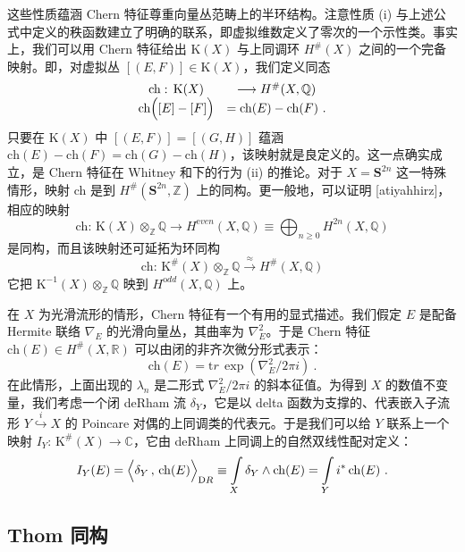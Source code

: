 \documentclass[11pt,a4paper]{ctexart}
\newcommand{\SrcRange}[2]{\marginpar{\raggedright\footnotesize 原文 p.#1}}
\begin{document}
这些性质蕴涵 Chern 特征尊重向量丛范畴上的半环结构。注意性质 (i) 与上述公式中定义的秩函数建立了明确的联系，即虚拟维数定义了零次的一个示性类。事实上，我们可以用 Chern 特征给出 \({\mathrm K}(X)\) 与上同调环 \(H^\#(X)\) 之间的一个完备映射。即，对虚拟丛 \([(E,F)]\in{\mathrm K}(X)\)，我们定义同态 \[\begin{matrix}
\mathrm{ch}:\, {\mathrm K}(X)&\longrightarrow H^\#(X,{\mathbb{Q}})\\
\mathrm{ch}\Bigl(\left[E\right]-\left[F\right]\Bigr)&= \mathrm{ch}(E)-\mathrm{ch}(F)\ .
\end{matrix}\] 只要在 \({\mathrm K}(X)\) 中 \([(E,F)]=[(G,H)]\) 蕴涵 \(\mathrm{ch}(E)-\mathrm{ch}(F)=\mathrm{ch}(G)-\mathrm{ch}(H)\)，该映射就是良定义的。这一点确实成立，是 Chern 特征在 Whitney 和下的行为 (ii) 的推论。对于 \(X={\mathbf S}^{2n}\) 这一特殊情形，映射 ch 是到 \(H^\#({\mathbf S}^{2n},{\mathbb{Z}})\) 上的同构。更一般地，可以证明 [atiyahhirz]，相应的映射 \[\mathrm{ch}:\, {\mathrm K}(X)\otimes_{{\mathbb{Z}}}{\mathbb{Q}}\longrightarrow H^{\mathrm even}(X,{\mathbb{Q}})
\equiv\bigoplus_{n\geq0}H^{2n}(X,{\mathbb{Q}})\] 是同构，而且该映射还可延拓为环同构 \[\mathrm{ch}:\, {\mathrm K}^\#(X)\otimes_{{\mathbb{Z}}}{\mathbb{Q}} \stackrel{\approx}{\longrightarrow}
H^\#(X,{\mathbb{Q}})\] 它把 \({\mathrm K}^{-1}(X)\otimes_{{\mathbb{Z}}}{\mathbb{Q}}\) 映到 \(H^{\mathrm odd}(X,{\mathbb{Q}})\) 上。

在 \(X\) 为光滑流形的情形，Chern 特征有一个有用的显式描述。我们假定 \(E\) 是配备 Hermite 联络 \(\nabla_{E}\) 的光滑向量丛，其曲率为 \(\nabla^2_{E}\)。于是 Chern 特征 \(\mathrm{ch}(E)\in H^\#(X,{\mathbb{R}})\) 可以由闭的非齐次微分形式表示： \[\mathrm{ch}(E)={\mathrm tr}\,\exp\left(\nabla_{E}^2/2\pi i\right)\ .\] 在此情形，上面出现的 \(\lambda_n\) 是二形式 \(\nabla_E^2/2\pi i\) 的斜本征值。为得到 \(X\) 的数值不变量，我们考虑一个闭 deRham 流 \(\delta_Y\)，它是以 delta 函数为支撑的、代表嵌入子流形 \(Y\stackrel{i}{\hookrightarrow}X\) 的 Poincar\textquotesingle e 对偶的上同调类的代表元。于是我们可以给 \(Y\) 联系上一个映射 \(I_Y:\,{\mathrm K}^\#(X)\to{\mathbb{C}}\)，它由 deRham 上同调上的自然双线性配对定义： \[I_Y(E)=\Bigl\langle\delta_Y\,,\,\mathrm{ch}(E)\Bigr\rangle_{\mathrm DR}
\equiv\int\limits_X\delta_Y\wedge\mathrm{ch}(E)=\int\limits_Yi^*\,\mathrm{ch}(E)\ .\]

\SrcRange{88}{88}
\subsection{Thom 同构}\label{thom-ux540cux6784}
\end{document}
